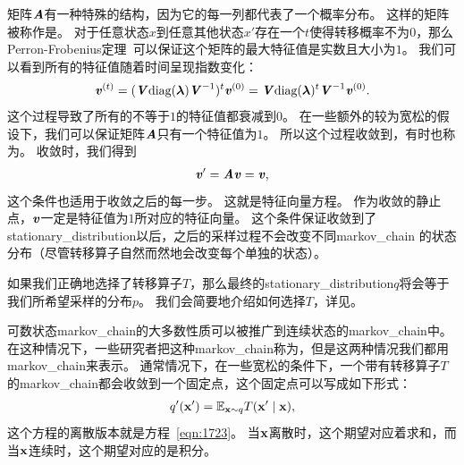 矩阵$\boldsymbol{\mathit{A}}$有一种特殊的结构，因为它的每一列都代表了一个概率分布。 %
这样的矩阵被称作是。 %
对于任意状态$x$到任意其他状态$x'$存在一个$t$使得转移概率不为$0$，那么Perron-Frobenius定理~\citep{perron1907theorie,frobenius1908matrizen}可以保证这个矩阵的最大特征值是实数且大小为$1$。
我们可以看到所有的特征值随着时间呈现指数变化： 
\begin{align}
\boldsymbol{\mathit{v}}^{(t)} = (\boldsymbol{\mathit{V}} \text{diag}(\boldsymbol{\lambda})\boldsymbol{\mathit{V}}^{-1})^{t} \boldsymbol{\mathit{v}}^{(0)} = \boldsymbol{\mathit{V}} \text{diag}(\boldsymbol{\lambda})^t \boldsymbol{\mathit{V}}^{-1} \boldsymbol{\mathit{v}}^{(0)}.
\end{align}
这个过程导致了所有的不等于$1$的特征值都衰减到$0$。  
在一些额外的较为宽松的假设下，我们可以保证矩阵$\boldsymbol{\mathit{A}}$只有一个特征值为$1$。   %
所以这个过程收敛到，有时也称为。  %
收敛时，我们得到 
\begin{align}
\label{eqn:1723}
\boldsymbol{\mathit{v}} ' = \boldsymbol{\mathit{A}} \boldsymbol{\mathit{v}} = \boldsymbol{\mathit{v}},
\end{align}
这个条件也适用于收敛之后的每一步。
这就是特征向量方程。
作为收敛的静止点，$\boldsymbol{\mathit{v}}$一定是特征值为$1$所对应的特征向量。   %
这个条件保证收敛到了\gls{stationary_distribution}以后，之后的采样过程不会改变不同\gls{markov_chain}   的状态分布（尽管转移算子自然而然地会改变每个单独的状态）。   %


如果我们正确地选择了转移算子$T$，那么最终的\gls{stationary_distribution}$q$将会等于我们所希望采样的分布$p$。  
我们会简要地介绍如何选择$T$，详见。 


可数状态\gls{markov_chain}的大多数性质可以被推广到连续状态的\gls{markov_chain}中。 
在这种情况下，一些研究者把这种\gls{markov_chain}称为，但是这两种情况我们都用\gls{markov_chain}来表示。 %
通常情况下，在一些宽松的条件下，一个带有转移算子$T$的\gls{markov_chain}都会收敛到一个固定点，这个固定点可以写成如下形式：  %
\begin{align}
q' (\mathbf{x}') = \mathbb{E}_{\mathbf{x}\sim q}T(\mathbf{x}'\mid \mathbf{x}),
\end{align}
这个方程的离散版本就是方程~\eqref{eqn:1723}。	%
当$\mathbf{x}$离散时，这个期望对应着求和，而当$\mathbf{x}$连续时，这个期望对应的是积分。   %


